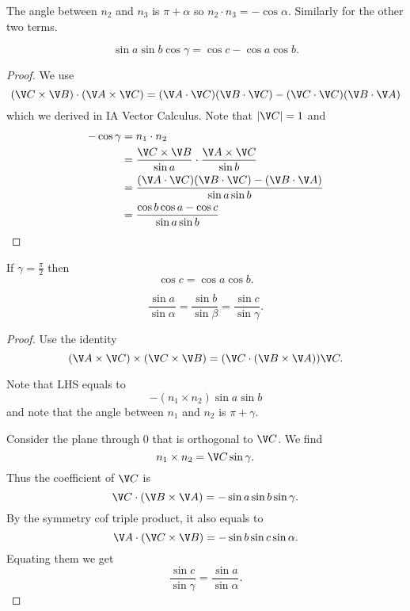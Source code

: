 \documentclass[a4paper]{article}
\begin{document}
\begin{note}
  The angle between \(n_2\) and \(n_3\) is \(\pi + \alpha\) so \(n_2 \cdot n_3 = -\cos \alpha\). Similarly for the other two terms.
\end{note}

\begin{theorem}
  \[
    \sin a \sin b \cos \gamma = \cos c - \cos a \cos b.
  \]
\end{theorem}

\begin{proof}
  We use
  \[
    (\V C \times \V B) \cdot (\V A \times \V C) = (\V A \cdot \V C)(\V B \cdot \V C) - (\V C \cdot \V C)(\V B \cdot \V A)
  \]
  which we derived in IA Vector Calculus. Note that \(|\V C| = 1\) and
  \begin{align*}
    -\cos \gamma &= n_1 \cdot n_2 \\
                 &= \frac{\V C \times \V B}{\sin a} \cdot \frac{\V A \times \V C}{\sin b} \\
                 &= \frac{(\V A \cdot \V C)(\V B \cdot \V C) - (\V B \cdot \V A)}{\sin a \sin b} \\
                 &= \frac{\cos b \cos a - \cos c}{\sin a \sin b}
  \end{align*}
\end{proof}

\begin{corollary}
  If \(\gamma = \frac{\pi}{2}\) then
  \[
    \cos c = \cos a \cos b.
  \]
\end{corollary}

\begin{theorem}
  \[
    \frac{\sin a}{\sin \alpha} = \frac{\sin b}{\sin \beta} = \frac{\sin c}{\sin \gamma}.
  \]
\end{theorem}

\begin{proof}
  Use the identity
  \[
    (\V A \times \V C) \times (\V C \times \V B) = (\V C \cdot (\V B \times \V A)) \V C.
  \]

  Note that LHS equals to
  \[
    -(n_1 \times n_2) \sin a \sin b
  \]
  and note that the angle between \(n_1\) and \(n_2\) is \(\pi + \gamma\).

  Consider the plane through \(0\) that is orthogonal to \(\V C\). We find
  \[
    n_1 \times n_2 = \V C \sin \gamma.
  \]
  Thus the coefficient of \(\V C\) is
  \[
    \V C \cdot (\V B \times \V A) = -\sin a \sin b \sin \gamma.
  \]
  By the symmetry cof triple product, it also equals to
  \[
    \V A \cdot (\V C \times \V B) = -\sin b \sin c \sin \alpha.
  \]
  Equating them we get
  \[
    \frac{\sin c}{\sin \gamma} = \frac{\sin a}{\sin \alpha}.
  \]
\end{proof}
\end{document}
